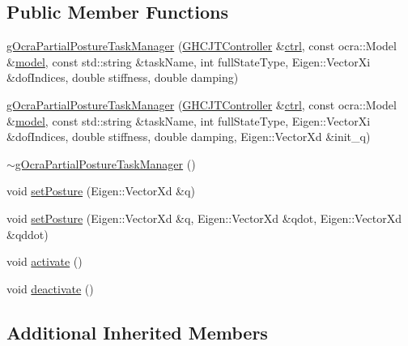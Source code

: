 \subsection*{Public Member Functions}
\begin{DoxyCompactItemize}
\item 
\hyperlink{classgocra_1_1gOcraPartialPostureTaskManager_afd597f38d4ee2dfb05606959bf90757f}{g\+Ocra\+Partial\+Posture\+Task\+Manager} (\hyperlink{classgocra_1_1GHCJTController}{G\+H\+C\+J\+T\+Controller} \&\hyperlink{classgocra_1_1gOcraTaskManagerBase_a52d76d9b54d92f3d31faeaafda99e4c7}{ctrl}, const ocra\+::\+Model \&\hyperlink{classgocra_1_1gOcraTaskManagerBase_adc439e7170f7120611fc6d009d06404e}{model}, const std\+::string \&task\+Name, int full\+State\+Type, Eigen\+::\+Vector\+Xi \&dof\+Indices, double stiffness, double damping)
\item 
\hyperlink{classgocra_1_1gOcraPartialPostureTaskManager_a2dd620f693ca7ad7492e298a6a081b7d}{g\+Ocra\+Partial\+Posture\+Task\+Manager} (\hyperlink{classgocra_1_1GHCJTController}{G\+H\+C\+J\+T\+Controller} \&\hyperlink{classgocra_1_1gOcraTaskManagerBase_a52d76d9b54d92f3d31faeaafda99e4c7}{ctrl}, const ocra\+::\+Model \&\hyperlink{classgocra_1_1gOcraTaskManagerBase_adc439e7170f7120611fc6d009d06404e}{model}, const std\+::string \&task\+Name, int full\+State\+Type, Eigen\+::\+Vector\+Xi \&dof\+Indices, double stiffness, double damping, Eigen\+::\+Vector\+Xd \&init\+\_\+q)
\item 
\hyperlink{classgocra_1_1gOcraPartialPostureTaskManager_af34bf754f071b3212c850c3b11b3a6b2}{$\sim$g\+Ocra\+Partial\+Posture\+Task\+Manager} ()
\item 
void \hyperlink{classgocra_1_1gOcraPartialPostureTaskManager_ac2fc6522b441a12831abd768ee8b591e}{set\+Posture} (Eigen\+::\+Vector\+Xd \&q)
\item 
void \hyperlink{classgocra_1_1gOcraPartialPostureTaskManager_a98a6312d1705dbc7ae682bf7fb98a28c}{set\+Posture} (Eigen\+::\+Vector\+Xd \&q, Eigen\+::\+Vector\+Xd \&qdot, Eigen\+::\+Vector\+Xd \&qddot)
\item 
void \hyperlink{classgocra_1_1gOcraPartialPostureTaskManager_ad33a136127d9cdb480748954dc0fd038}{activate} ()
\item 
void \hyperlink{classgocra_1_1gOcraPartialPostureTaskManager_a393b7f72db340b4d2bed172fd3f3ae1d}{deactivate} ()
\end{DoxyCompactItemize}
\subsection*{Additional Inherited Members}



